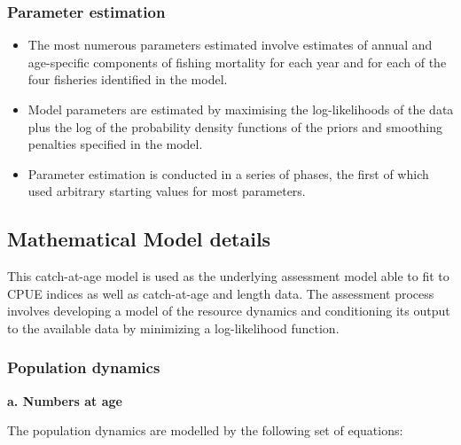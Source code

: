\documentclass{article}
\begin{document}

\subsubsection{Parameter estimation}

\begin{itemize}

\item The most numerous parameters estimated involve estimates of annual and age-specific components of fishing mortality for each year and for each of the four fisheries identified in the model.

\item Model parameters are estimated by maximising the log-likelihoods of the data plus the log of the probability density functions of the priors and smoothing penalties specified in the model.

\item Parameter estimation is conducted in a series of phases, the first of which used arbitrary starting values for most parameters.

\end{itemize}

\subsection{Mathematical Model details}

This catch-at-age model is used as the underlying assessment model able to fit to CPUE indices as well as catch-at-age and length data. The assessment process involves developing a model of the resource dynamics and conditioning its output to the available data by minimizing a log-likelihood function.

\subsubsection{Population dynamics}

\textbf{a. Numbers at age}

The population dynamics are modelled by the following set of equations:
\end{document}
